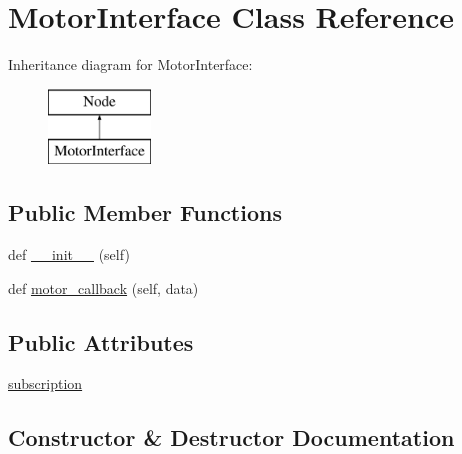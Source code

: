\hypertarget{classtoxic__hardware_1_1motor__interface_1_1MotorInterface}{}\section{Motor\+Interface Class Reference}
\label{classtoxic__hardware_1_1motor__interface_1_1MotorInterface}
Inheritance diagram for Motor\+Interface\+:\begin{figure}[H]
\begin{center}
\leavevmode
\includegraphics[height=2.000000cm]{d6/dfb/classtoxic__hardware_1_1motor__interface_1_1MotorInterface}
\end{center}
\end{figure}
\subsection*{Public Member Functions}
\begin{DoxyCompactItemize}
\item 
def \mbox{\hyperlink{classtoxic__hardware_1_1motor__interface_1_1MotorInterface_ae64f0875afe3067b97ba370b354b9213}{\+\_\+\+\_\+init\+\_\+\+\_\+}} (self)
\item 
def \mbox{\hyperlink{classtoxic__hardware_1_1motor__interface_1_1MotorInterface_a9e946487184abfcf65c5372008f4e868}{motor\+\_\+callback}} (self, data)
\end{DoxyCompactItemize}
\subsection*{Public Attributes}
\begin{DoxyCompactItemize}
\item 
\mbox{\hyperlink{classtoxic__hardware_1_1motor__interface_1_1MotorInterface_a4b0698733c4dfaffe8e2b4cd952b6f82}{subscription}}
\end{DoxyCompactItemize}


\subsection{Constructor \& Destructor Documentation}
\mbox{\label{classtoxic__hardware_1_1motor__interface_1_1MotorInterface_ae64f0875afe3067b97ba370b354b9213}} 
